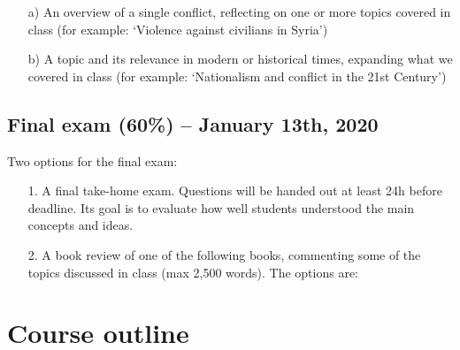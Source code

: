 \documentclass[12pt, a4paper]{article}
\begin{document}
\begin{itemize}
\setlength\itemsep{0pt}
\item[a)] An overview of a single conflict, reflecting on one or more topics covered in class (for example: `Violence against civilians in Syria')
\item[b)] A topic and its relevance in modern or historical times, expanding what we covered in class (for example: `Nationalism and conflict in the 21st Century')
\end{itemize}

\subsection*{Final exam (60\%) -- January 13th, 2020}

Two options for the final exam:

\begin{itemize}
  \item[1.] A final take-home exam. Questions will be handed out at least 24h before deadline. Its goal is to evaluate how well students understood the main concepts and ideas.
  \item[2.] A book review of one of the following books, commenting some of the topics discussed in class (max 2,500 words). The options are:
\end{itemize}

\newpage
\section{Course outline}
\end{document}

